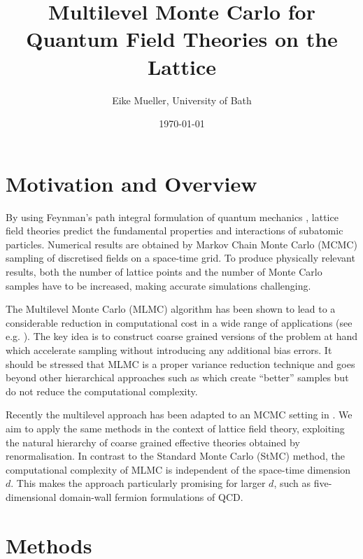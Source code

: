 \documentclass[11pt]{article}
\author{Eike Mueller, University of Bath}
\date{\today}
\title{Multilevel Monte Carlo for Quantum Field Theories on the Lattice}
\begin{document}
\maketitle
\section{Motivation and Overview}
By using Feynman's path integral formulation of quantum mechanics \cite{Feynman2010}, lattice field theories predict the fundamental properties and interactions of subatomic particles. Numerical results are obtained by Markov Chain Monte Carlo (MCMC) sampling of discretised fields on a space-time grid. To produce physically relevant results, both the number of lattice points and the number of Monte Carlo samples have to be increased, making accurate simulations challenging.

The Multilevel Monte Carlo (MLMC) algorithm \cite{Heinrich2001,Giles2008,Giles2015} has been shown to lead to a considerable reduction in computational cost in a wide range of applications (see e.g. \cite{Katsiolides2017}). The key idea is to construct coarse grained versions of the problem at hand which accelerate sampling without introducing any additional bias errors. It should be stressed that MLMC is a proper variance reduction technique and goes beyond other hierarchical approaches such as \cite{Faas1986} which create ``better'' samples but do not reduce the computational complexity.

Recently the multilevel approach has been adapted to an MCMC setting in \cite{Dodwell2015}. We aim to apply the same methods in the context of lattice field theory, exploiting the natural hierarchy of coarse grained effective theories obtained by renormalisation. In contrast to the Standard Monte Carlo (StMC) method, the computational complexity of MLMC is independent of the space-time dimension $d$. This makes the approach particularly promising for larger $d$, such as five-dimensional domain-wall fermion formulations \cite{Kaplan1992} of QCD. 
\section{Methods}

\end{document}
